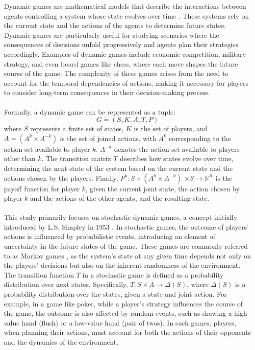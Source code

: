 \begin{flushleft}
    
    Dynamic games are mathematical models that describe the interactions between agents controlling a system whose state evolves over time \cite{dynamicgames/krawczyk-jacek}. These systems rely on the current state and the actions of the agents to determine future states. Dynamic games are particularly useful for studying scenarios where the consequences of decisions unfold progressively and agents plan their strategies accordingly. Examples of dynamic games include economic competition, military strategy, and even board games like chess, where each move shapes the future course of the game. The complexity of these games arises from the need to account for the temporal dependencies of actions, making it necessary for players to consider long-term consequences in their decision-making process.\\~\\

    Formally, a dynamic game can be represented as a tuple:
    \begin{equation}
        G = (S, K, A, T, P)
        \label{eq:dyngame}
    \end{equation}
    where $S$ represents a finite set of states, $K$ is the set of players, and $A = (A^k \times A^{-k})$ is the set of joined actions, with $A^k$ corresponding to the action set available to player $k$. $A^{-k}$ denotes the action set available to players other than $k$. The transition matrix $T$ describes how states evolve over time, determining the next state of the system based on the current state and the actions chosen by the players. Finally, $P^k: S \times (A^k \times A^{-k})$ \allowbreak $\times S \to \mathbb{R}^K$ is the payoff function for player $k$, given the current joint state, the action chosen by player $k$ and the actions of the other agents, and the resulting state.\\~\\

    This study primarily focuses on stochastic dynamic games, a concept initially introduced by L.S. Shapley in 1953 \cite{Shapley1953StochasticG}. In stochastic games, the outcome of players' actions is influenced by probabilistic events, introducing an element of uncertainty in the future states of the game. These games are commonly referred to as Markov games \cite{Shoham_Leyton-Brown_2008}, as the system's state at any given time depends not only on the players' decisions but also on the inherent randomness of the environment. The transition function $T$ in a stochastic game is defined as a probability distribution over next states. Specifically, $T: S \times A \to \Delta(S)$, where $\Delta(S)$ is a probability distribution over the states, given a state and joint action. For example, in a game like poker, while a player's strategy influences the course of the game, the outcome is also affected by random events, such as drawing a high-value hand (flush) or a low-value hand (pair of twos). In such games, players, when planning their actions, must account for both the actions of their opponents and the dynamics of the environment.\\~\\


\end{flushleft}
